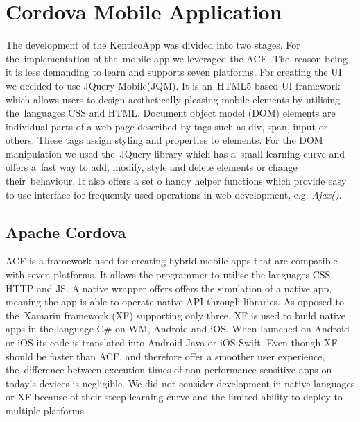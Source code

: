 \section{Cordova Mobile Application}
The development of the KenticoApp was divided into two stages. For the~implementation of the~mobile app we leveraged the ACF. The~reason being it is less demanding to learn and supports seven platforms. For creating the UI  we decided to use JQuery Mobile(JQM). It is an~HTML5-based UI framework which allows users to design aesthetically pleasing mobile elements by utilising the~languages CSS and HTML. Document object model (DOM) elements are individual parts of a web page described by tags such as div, span, input or others. These tags assign styling and properties to elements. For the DOM manipulation we used the~JQuery library which has a~small learning curve and offers a~fast way to add, modify, style and delete elements or change their~behaviour. It also offers a set o handy helper functions which provide easy to use interface for frequently used operations in web development, e.g. \textit{Ajax()}.
\subsection{Apache Cordova}
 ACF is a framework used for creating hybrid mobile apps that are compatible with seven platforms. It allows the programmer to utilise the languages CSS, HTTP and JS. A native wrapper offers offers the simulation of a native app, meaning the app is able to operate native API through libraries. As opposed to the~Xamarin framework (XF) supporting only three. XF is used to build native apps in the language C\# on WM, Android and iOS. When launched on Android or iOS its code is translated into Android Java or iOS Swift. Even though XF should be faster than ACF, and therefore offer a smoother user experience, the~difference between execution times of non performance sensitive apps on today's devices is negligible. We did not consider development in native languages or XF because of their steep learning curve and the limited ability to deploy to multiple platforms. 

